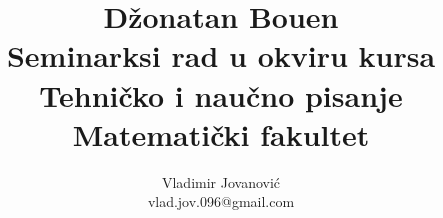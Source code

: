 \documentclass[a4paper]{article}
\begin{document}
\title{Džonatan Bouen\\ \small{Seminarksi rad u okviru kursa\\Tehničko i naučno pisanje\\Matematički fakultet}}

\author{Vladimir Jovanović\\vlad.jov.096@gmail.com}
\maketitle


\tableofcontents
\newpage

\begin{tabular}{|l|l|}


\end{tabular}
\end{document}
